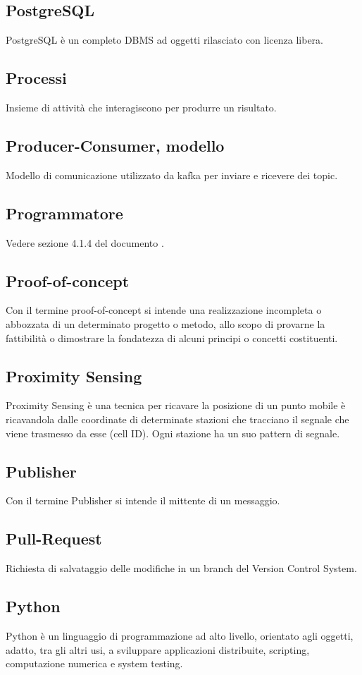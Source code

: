 \subsection{PostgreSQL}  PostgreSQL è un completo DBMS ad oggetti rilasciato con licenza libera.
\subsection{Processi}  Insieme di attività che interagiscono per produrre un risultato.
\subsection{Producer-Consumer, modello}  Modello di comunicazione utilizzato da kafka per inviare e ricevere dei topic.
\subsection{Programmatore}  Vedere sezione 4.1.4 del documento .
\subsection{Proof-of-concept }  Con il termine proof-of-concept si intende una realizzazione incompleta o abbozzata di un determinato progetto o metodo, allo scopo di provarne la fattibilità o dimostrare la fondatezza di alcuni principi o concetti costituenti.
\subsection{Proximity Sensing}  Proximity Sensing è una tecnica per ricavare la posizione di un punto mobile è ricavandola dalle coordinate di determinate stazioni che tracciano il segnale che viene trasmesso da esse (cell ID). Ogni stazione ha un suo pattern di segnale.
\subsection{Publisher}  Con il termine Publisher si intende il mittente di un messaggio.
\subsection{Pull-Request}  Richiesta di salvataggio delle modifiche in un branch del Version Control System.
\subsection{Python}  Python è un linguaggio di programmazione ad alto livello, orientato agli oggetti, adatto, tra gli altri usi, a sviluppare applicazioni distribuite, scripting, computazione numerica e system testing.


